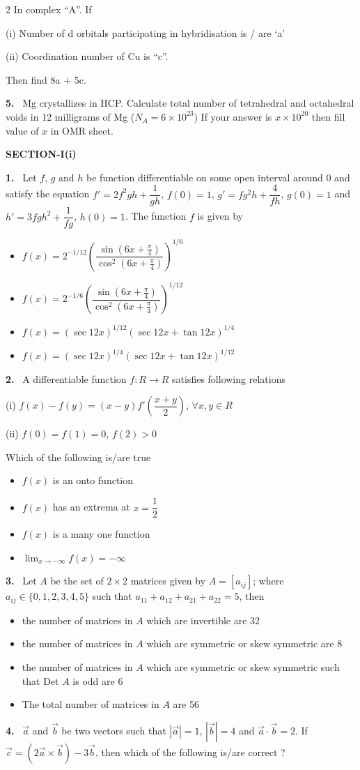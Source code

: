 \documentclass[10pt]{extarticle}
\newcommand{\partsec}[2]{\par\medskip\noindent{\large\bfseries PART-#1: #2}\par\smallskip}
\newcommand{\sect}[1]{\par\smallskip\noindent\textbf{#1}\par}
\newcommand{\qn}[1]{\par\smallskip\noindent\textbf{#1.}~}
\newenvironment{qoptions}{\begin{itemize}[leftmargin=1.8em,itemsep=1pt,topsep=2pt,label={}]}{\end{itemize}}
\newcommand{\opt}[2]{\item[(#1)] #2}
\begin{document}
\begin{multicols}{2}
In complex ``A''. If\par
(i) Number of d orbitals participating in hybridisation is / are `a'\par
(ii) Coordination number of Cu is ``c''.\par
Then find 8a + 5c.
\qn{5} Mg crystallizes in HCP. Calculate total number of tetrahedral and octahedral voids in 12 milligrams of Mg ($N_A=6\times10^{23}$) If your answer is $x\times10^{20}$ then fill value of $x$ in OMR sheet.
\partsec{3}{MATHEMATICS}
\sect{SECTION-I(i)}
\qn{1} Let $f$, $g$ and $h$ be function differentiable on some open interval around 0 and satisfy the equation $f'=2f^2gh+\dfrac1{gh}$, $f(0)=1$, $g'=fg^2h+\dfrac4{fh}$, $g(0)=1$ and $h'=3fgh^2+\dfrac1{fg}$, $h(0)=1$. The function $f$ is given by
\begin{qoptions}
\opt{A}{$f(x)=2^{-1/12}\left(\dfrac{\sin\left(6x+\frac\pi4\right)}{\cos^2\left(6x+\frac\pi4\right)}\right)^{1/6}$}
\opt{B}{$f(x)=2^{-1/6}\left(\dfrac{\sin\left(6x+\frac\pi4\right)}{\cos^2\left(6x+\frac\pi4\right)}\right)^{1/12}$}
\opt{C}{$f(x)=(\sec12x)^{1/12}(\sec12x+\tan12x)^{1/4}$}
\opt{D}{$f(x)=(\sec12x)^{1/4}(\sec12x+\tan12x)^{1/12}$}
\end{qoptions}
\qn{2} A differentiable function $f:R\to R$ satisfies following relations\par
(i) $f(x)-f(y)=(x-y)f'\left(\dfrac{x+y}2\right)$, $\forall x,y\in R$\par
(ii) $f(0)=f(1)=0$, $f(2)>0$\par
Which of the following is/are true
\begin{qoptions}
\opt{A}{$f(x)$ is an onto function}
\opt{B}{$f(x)$ has an extrema at $x=\dfrac12$}
\opt{C}{$f(x)$ is a many one function}
\opt{D}{$\displaystyle\lim_{x\to-\infty}f(x)=-\infty$}
\end{qoptions}
\qn{3} Let $A$ be the set of $2\times2$ matrices given by $A=[a_{ij}]$; where $a_{ij}\in\{0,1,2,3,4,5\}$ such that $a_{11}+a_{12}+a_{21}+a_{22}=5$, then
\begin{qoptions}
\opt{A}{the number of matrices in $A$ which are invertible are 32}
\opt{B}{the number of matrices in $A$ which are symmetric or skew symmetric are 8}
\opt{C}{the number of matrices in $A$ which are symmetric or skew symmetric such that Det $A$ is odd are 6}
\opt{D}{The total number of matrices in $A$ are 56}
\end{qoptions}
\qn{4} $\vec a$ and $\vec b$ be two vectors such that $|\vec a|=1$, $|\vec b|=4$ and $\vec a\cdot\vec b=2$. If $\vec c=\left(2\vec a\times\vec b\right)-3\vec b$, then which of the following is/are correct ?

\end{multicols}
\end{document}
